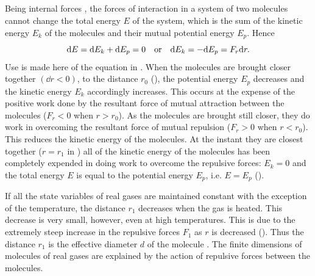 \subsection{}\label{12.1.10} Being internal forces , the forces of interaction in a system of two molecules cannot change the total energy $E$ of the system, which is the sum of the kinetic energy $E_{k}$ of the molecules and their mutual potential energy $E_{p}$. Hence
\begin{equation*}%
\dd E = \dd E_{k} + \dd E_{p} = 0 \qor \dd E_{k}  = - \dd E_{p} = F_{r} \dd r.
\end{equation*}
Use is made here of the equation in . When the molecules are brought closer together $(\dd r < 0)$, to the distance $r_{0}$ (), the potential energy $E_{p}$ decreases and the kinetic energy $E_{k}$ accordingly increases. This occurs at the expense of the positive work done by the resultant force of mu­tual attraction between the molecules  ($F_{r} < 0$ when $r > r_{0}$). As the molecules are brought still closer, they do work in overcoming the resultant force of mutual repulsion ($F_{r} > 0$ when $r < r_{0}$). This reduces the kinetic energy of the molecules. At the instant they are closest together ($r = r_{1}$ in ) all of the kinetic energy of the molecules has been completely expended in doing work to overcome the repulsive forces:
$E_{k} = 0$ and the total energy $E$ is equal to the potential energy $E_{p}$, i.e. $E = E_{p}$ ().

If all the state variables of real gases are maintained constant with the exception of the temperature, the distance $r_{1}$ decreases when the gas is heated. This decrease is very small, however, even at high temperatures. This is due to the extremely steep increase in the repulsive forces $F_{1}$ as $r$ is decreased (). Thus the distance $r_{1}$ is the effective diameter $d$ of the molecule . The finite dimensions of molecules of real gases are explained by the action of repulsive forces between the mol­ecules.


